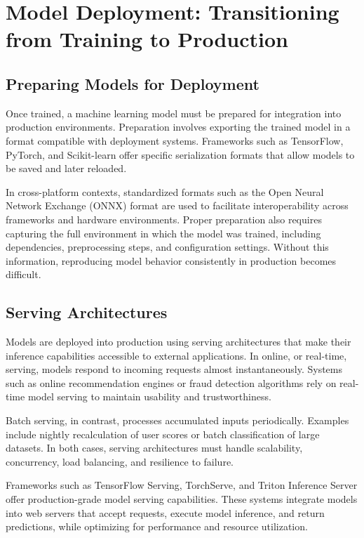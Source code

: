 \documentclass[openany]{book}
\begin{document}
\section{Model Deployment: Transitioning from Training to Production}

\subsection{Preparing Models for Deployment}
Once trained, a machine learning model must be prepared for integration into 
production environments. Preparation involves exporting the trained model in a 
format compatible with deployment systems. Frameworks such as TensorFlow, 
PyTorch, and Scikit-learn offer specific serialization formats that allow models 
to be saved and later reloaded.

In cross-platform contexts, standardized formats such as the Open Neural Network 
Exchange (ONNX) format are used to facilitate interoperability across frameworks 
and hardware environments. Proper preparation also requires capturing the full 
environment in which the model was trained, including dependencies, 
preprocessing steps, and configuration settings. Without this information, 
reproducing model behavior consistently in production becomes difficult.

\subsection{Serving Architectures}
Models are deployed into production using serving architectures that make their 
inference capabilities accessible to external applications. In online, or 
real-time, serving, models respond to incoming requests almost instantaneously. 
Systems such as online recommendation engines or fraud detection algorithms rely
on real-time model serving to maintain usability and trustworthiness.

Batch serving, in contrast, processes accumulated inputs periodically. Examples 
include nightly recalculation of user scores or batch classification of large 
datasets. In both cases, serving architectures must handle scalability, 
concurrency, load balancing, and resilience to failure.

Frameworks such as TensorFlow Serving, TorchServe, and Triton Inference Server 
offer production-grade model serving capabilities. These systems integrate 
models into web servers that accept requests, execute model inference, and 
return predictions, while optimizing for performance and resource utilization.
\end{document}

